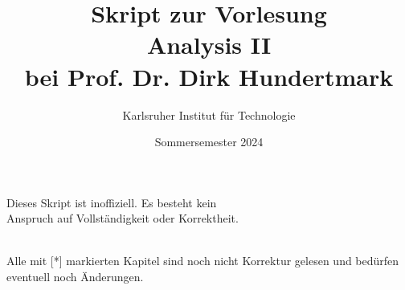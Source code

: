 \documentclass[11pt, twoside, a4paper]{article}
\theoremstyle{plain}
\begin{document}
    \title{\vspace{3cm} Skript zur Vorlesung\\Analysis II\\bei Prof. Dr. Dirk Hundertmark}
    \author{Karlsruher Institut für Technologie}
    \date{Sommersemester 2024}
    \maketitle
    \begin{center}
        Dieses Skript ist inoffiziell. Es besteht kein\\Anspruch auf Vollständigkeit oder Korrektheit.
    \end{center}
    \thispagestyle{empty}
    \newpage

    \tableofcontents
    ~\\
    Alle mit [*] markierten Kapitel sind noch nicht Korrektur gelesen und bedürfen eventuell noch Änderungen.

    \newpage
\end{document}

